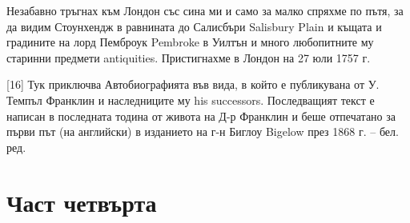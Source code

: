 \documentclass[12pt]{book}
\begin{document}
Незабавно тръгнах към Лондон със сина ми и само за малко спряхме по пътя, за да видим Стоунхендж в равнината до Салисбъри Salisbury Plain и къщата и градините на лорд Пемброук Pembroke в Уилтън и много любопитните му старинни предмети antiquities. Пристигнахме в Лондон на 27 юли 1757 г.

     [16] Тук приключва Автобиографията във вида, в който е публикувана от У. Темпъл Франклин и наследниците му his successors. Последващият текст е написан в последната тодина от живота на Д-р Франклин и беше отпечатано за първи път (на английски) в изданието на г-н Биглоу Bigelow през 1868 г. – бел. ред.

\chapter{Част четвърта}
\end{document}
